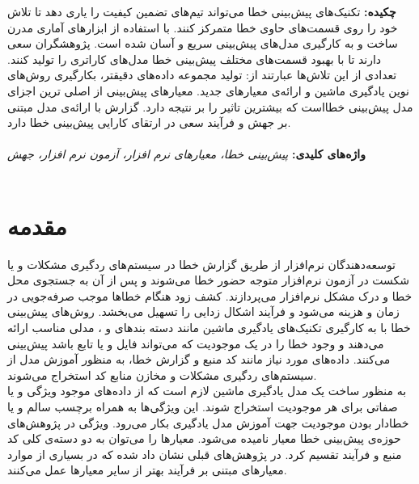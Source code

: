 \thispagestyle{empty}
\noindent
\renewcommand*\thesection{\arabic{section}}
\textbf{\large{چکیده:}}
تکنیک‌های پیش‌بینی خطا می‌تواند تیم‌های تضمین کیفیت را یاری دهد تا تلاش خود را  روی قسمت‌های حاوی خطا متمرکز کنند. با استفاده از ابزارهای آماری مدرن  ساخت و به کارگیری مدل‌های پیش‌بینی سریع و آسان شده است. پژوهشگران سعی دارند تا با بهبود قسمت‌های مختلف پیش‌بینی خطا مدل‌های کاراتری را تولید کنند. تعدادی از این تلاش‌ها عبارتند از: ‌تولید مجموعه داده‌های دقیقتر، بکارگیری روش‌های نوین یادگیری ماشین و ارائه‌ی معیارهای جدید. معیارهای پیش‌بینی از اصلی ترین اجزای مدل پیش‌بینی  خطااست که بیشترین تاثیر را بر نتیجه دارد.  گزارش با‌ ارائه‌ی مدل مبتنی بر جهش و فرآیند سعی در ارتقای کارایی پیش‌بینی خطا دارد. 
\\\\
\textbf{واژه‌های کلیدی:}\textit{ 
پیش‌بینی خطا، معیارهای نرم افزار، آزمون نرم افزار، جهش
}\\\\
\section{مقدمه}
\label{sec:intro}
  توسعه‌دهندگان نرم‌افزار از طریق گزارش خطا در سیستم‌های ردگیری مشکلات و یا شکست در آزمون نرم‌افزار متوجه حضور خطا می‌شوند و پس از آن به جستجوی محل خطا و درک مشکل  نرم‌افزار می‌پردازند. کشف زود هنگام خطاها موجب صرفه‌جویی در زمان و هزینه می‌شود و فرآیند اشکال زدایی را تسهیل می‌بخشد. روش‌های پیش‌بینی خطا با به کارگیری تکنیک‌های یادگیری ماشین مانند دسته ‌بندهای  و  ، مدلی مناسب ارائه می‌دهند و وجود خطا را در یک موجودیت که می‌تواند فایل و یا تابع باشد پیش‌بینی می‌کنند. داده‌های مورد نیاز مانند کد منبع و گزارش خطا، به منظور آموزش مدل از سیستم‌های ردگیری مشکلات و مخازن منابع کد استخراج می‌شوند. \\
  
 به منظور ساخت یک مدل یادگیری ماشین لازم است که از داده‌های موجود ویژگی و یا صفاتی  برای هر موجودیت استخراج شوند. این ویژگی‌ها به همراه برچسب سالم و یا خطادار بودن موجودیت جهت آموزش مدل یادگیری بکار می‌رود.  ویژگی  در پژوهش‌های حوزه‌ی پیش‌بینی خطا معیار  نامیده می‌شود.  معیارها را می‌توان به دو دسته‌ی کلی کد منبع و فرآیند تقسیم کرد. در پژوهش‌های قبلی نشان داد شده که در بسیاری از موارد معیارهای مبتنی بر فرآیند بهتر از سایر معیارها عمل می‌کنند\cite{rahman2013and}\cite{radjenovic2013software}. \\
 
